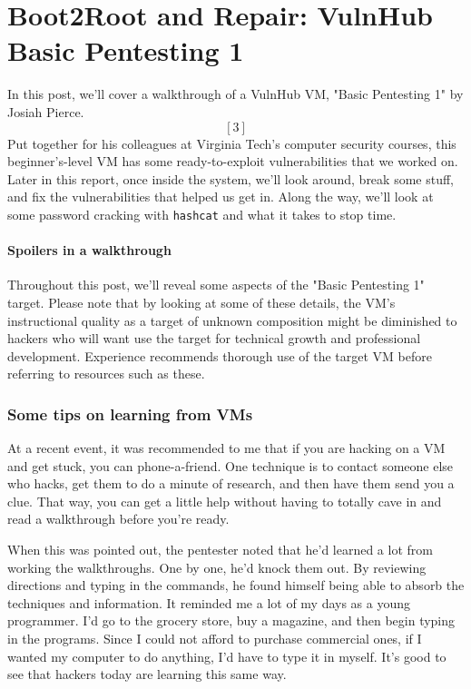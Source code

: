 \chapter{Boot2Root and Repair: VulnHub Basic Pentesting 1}

In this post, we'll cover a walkthrough of a VulnHub VM, "Basic Pentesting 1" by Josiah Pierce. \[[3]\]  Put together for his colleagues at Virginia Tech's computer security courses, this beginner's-level VM has some ready-to-\gls{exploit} vulnerabilities that we worked on.  Later in this report, once inside the system, we'll look around, break some stuff, and fix the vulnerabilities that helped us get in.  Along the way, we'll look at some \gls{password} cracking with \texttt{hashcat} and what it takes to stop time. 


\subsubsection{Spoilers in a walkthrough}
    Throughout this post, we'll reveal some aspects of the "Basic Pentesting 1" target.  Please note that by looking at some of these details, the VM's instructional quality as a target of unknown composition might be diminished to hackers who will want use the target for technical growth and professional development.  Experience recommends thorough use of the target VM before referring to resources such as these.

\subsection{Some tips on learning from VMs}
At a recent event, it was recommended to me that if you are hacking on a VM and get stuck, you can phone-a-friend.  One technique is to contact someone else who hacks, get them to do a minute of research, and then have them send you a clue.  That way, you can get a little help without having to totally cave in and read a walkthrough before you're ready.

When this was pointed out, the pentester noted that he'd learned a lot from working the walkthroughs.  One by one, he'd knock them out.  By reviewing directions and typing in the commands, he found himself being able to absorb the techniques and information.  It reminded me a lot of my days as a young programmer.  I'd go to the grocery store, buy a magazine, and then begin typing in the programs.  Since I could not afford to purchase commercial ones, if I wanted my computer to do anything, I'd have to type it in myself.  It's good to see that hackers today are learning this same way.  


